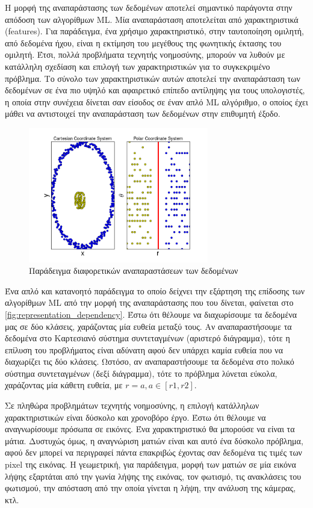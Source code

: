 Η μορφή της αναπαράστασης των δεδομένων αποτελεί σημαντικό παράγοντα στην
απόδοση των αλγορίθμων ML. Μία αναπαράσταση αποτελείται από χαρακτηριστικά (features).
Για παράδειγμα, ένα χρήσιμο χαρακτηριστικό, στην ταυτοποίηση ομιλητή, από δεδομένα ήχου,
είναι η εκτίμηση του μεγέθους της φωνητικής έκτασης του ομιλητή.
Έτσι, πολλά προβλήματα τεχνητής νοημοσύνης, μπορούν να λυθούν
με κατάλληλη σχεδίαση και επιλογή των χαρακτηριστικών για το συγκεκριμένο
πρόβλημα. Το σύνολο των χαρακτηριστικών αυτών αποτελεί την αναπαράσταση των δεδομένων
σε ένα πιο υψηλό και αφαιρετικό επίπεδο αντίληψης για τους υπολογιστές, η οποία
στην συνέχεια δίνεται σαν είσοδος σε έναν απλό ML αλγόριθμο, ο οποίος έχει
μάθει να αντιστοιχεί την αναπαράσταση των δεδομένων στην επιθυμητή έξοδο.
\begin{figure}[!h]
  \centering
  \includegraphics[width=0.7\textwidth]{./images/chapter3/representation_dependency.png}
  \caption[Παράδειγμα διαφορετικών αναπαραστάσεων των δεδομένων]{Παράδειγμα διαφορετικών αναπαραστάσεων των δεδομένων}
  \label{fig:representation_dependency}
\end{figure}

Ένα απλό και κατανοητό παράδειγμα το οποίο δείχνει την εξάρτηση της επίδοσης των
αλγορίθμων ML από την μορφή της αναπαράστασης που του δίνεται, φαίνεται στο
\autoref{fig:representation_dependency}. Έστω ότι θέλουμε να
διαχωρίσουμε τα δεδομένα μας σε δύο κλάσεις, χαράζοντας μία ευθεία
μεταξύ τους. Αν αναπαραστήσουμε τα δεδομένα στο Καρτεσιανό σύστημα συντεταγμένων (αριστερό διάγραμμα),
τότε η επίλυση του προβλήματος είναι αδύνατη αφού δεν υπάρχει καμία ευθεία
που να διαχωρίζει τις δύο κλάσεις. Ωστόσο, αν αναπαραστήσουμε τα δεδομένα
στο πολικό σύστημα συντεταγμένων (δεξί διάγραμμα), τότε το πρόβλημα λύνεται
εύκολα, χαράζοντας μία κάθετη ευθεία, με $r  = a, a \in [r1, r2]$.

Σε πληθώρα προβλημάτων τεχνητής νοημοσύνης, η επιλογή κατάλληλων χαρακτηριστικών
είναι δύσκολο και χρονοβόρο έργο. Έστω ότι θέλουμε να αναγνωρίσουμε
πρόσωπα σε εικόνες. Ένα χαρακτηριστικό θα μπορούσε να είναι τα μάτια. Δυστυχώς όμως,
η αναγνώριση ματιών είναι και αυτό ένα δύσκολο πρόβλημα, αφού δεν μπορεί να
περιγραφεί πάντα επακριβώς έχοντας σαν δεδομένα τις τιμές των pixel της εικόνας.
Η γεωμετρική, για παράδειγμα, μορφή των ματιών σε μία εικόνα λήψης εξαρτάται από την
γωνία λήψης της εικόνας, τον φωτισμό, τις ανακλάσεις του φωτισμού,
την απόσταση από την οποία γίνεται η λήψη, την ανάλυση της κάμερας, κτλ.

